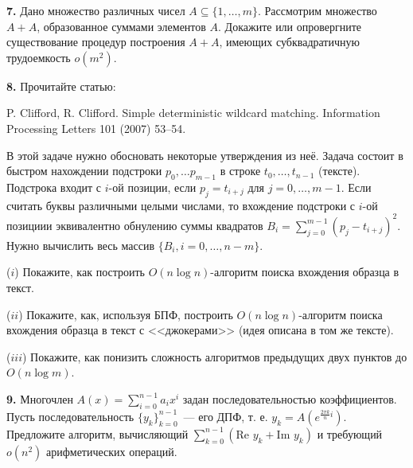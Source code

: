\documentclass[12pt,a5paper,fleqn]{article}
\begin{document}
{\bf 7.} Дано множество различных чисел $A\subseteq \{1,\dots,m\}$. Рассмотрим множество $A+A$, образованное суммами элементов $A$. 
Докажите или опровергните существование процедур построения
$A+A$, имеющих субквадратичную трудоемкость $o(m^2)$.



{\bf 8.} Прочитайте статью: 

P. Clifford, R. Clifford. Simple deterministic wildcard matching. Information Processing Letters 101 (2007) 53–54. 

В этой задаче нужно обосновать некоторые утверждения из неё.
Задача состоит в быстром нахождении подстроки $p_0,\dotsc p_{m-1}$ в строке $t_0,\dotsc, t_{n-1}$ (тексте). Подстрока входит с $i$-ой позиции, если $p_j = t_{i+j}$ для $j = 0,\dotsc, m-1$. Если считать буквы различными целыми числами, то вхождение подстроки с $i$-ой позициии эквивалентно обнулению суммы квадратов $B_i = \displaystyle\sum_{j=0}^{m-1} (p_j-t_{i+j})^2$. Нужно вычислить весь массив $\{B_i, i=0,\dotsc, n-m\}$. 

($i$) Покажите, как построить $O(n\log n)$-алгоритм поиска вхождения образца в текст. 

($ii$) Покажите, как, используя БПФ, построить $O(n \log n)$-алгоритм поиска вхождения образца в текст с <<джокерами>> (идея описана в том же тексте).

($iii$) Покажите, как понизить сложность алгоритмов предыдущих двух пунктов до $O(n \log m)$.



{\bf 9.} Многочлен $A(x) = \displaystyle\sum\limits_{i=0}^{n-1}a_i x^i$ задан последовательностью коэффициентов. Пусть последовательность $\{y_k\}_{k=0}^{n-1}$~--- его ДПФ, т. е. $y_k = A\left(e^{\tfrac{2\pi k}{n}i}\right)$.
  Предложите алгоритм, вычисляющий $\displaystyle\sum\limits_{k=0}^{n-1}(\text{Re } y_k + \text{Im } y_k)$ и требующий $o(n^2)$ арифметических операций. 
\end{document}
